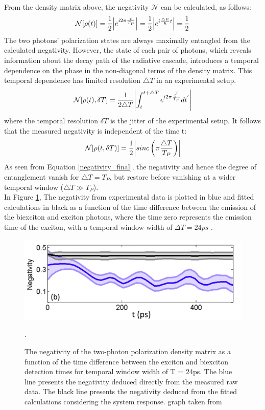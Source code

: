    From the density matrix above, the negativity $\mathcal{N}$ can be calculated, as follows:
   \begin{equation}
		\mathcal{N}[\rho(t)] = \frac{1}{2}\abs{e^{i2\pi \frac{t}{T_P}}} =\frac{1}{2}\abs{e^{i\frac{\triangle E}{\hslash}t}}=\frac{1}{2}
	\end{equation}
 The two photons' polarization states are always maximally entangled from the calculated negativity. However, the state of each pair of photons, which reveals information about the decay path of the radiative cascade, introduces a temporal dependence on the phase in the non-diagonal terms of the density matrix. This temporal dependence has limited resolution $\triangle T$ in an experimental setup.
 \begin{equation}
		\mathcal{N}[\rho(t),\delta T] = \frac{1}{2\triangle T} \abs{\int_t^{t+\triangle T}e^{i2\pi \frac{t^{'}}{T_P}}  dt^{'}}
\end{equation}
where the temporal resolution $\delta T$ is the jitter of the experimental setup. It follows that the measured negativity is independent of the time t:
 \begin{equation}\label{negativity_final}
		\mathcal{N}[\rho(t,\delta T)] = \frac{1}{2} \abs{ sinc \left( \pi \frac{\triangle T}{T_P} \right)}
\end{equation}
As seen from Equation \ref{negativity_final}, the negativity and hence the degree of entanglement vanish for $\triangle T = T_P$, but restore before vanishing at a wider temporal window ($\triangle T \gg T_P$).\\
In Figure \ref{Entanglement1}, The  negativity from experimental data is plotted in blue and fitted calculations in black as a function of the time difference between the emission of the biexciton and exciton photons, where the time zero represents the emission time of the exciton, with a temporal window width of $\Delta T = 24ps$ \cite{Winik2017}. 
 \begin{figure}
	\centering
	\includegraphics[scale=0.85]{figures/Entanglement_Integration1.png}
	\caption{The negativity of the two-photon polarization density matrix as a function of the time difference between the exciton and biexciton detection times for temporal window width of T = 24ps. The blue line presents the negativity deduced directly from the measured raw data. The black line presents the negativity deduced from the fitted calculations considering the system response. graph taken from \cite{Winik2017}}.
  \label{Entanglement1}
\end{figure}
